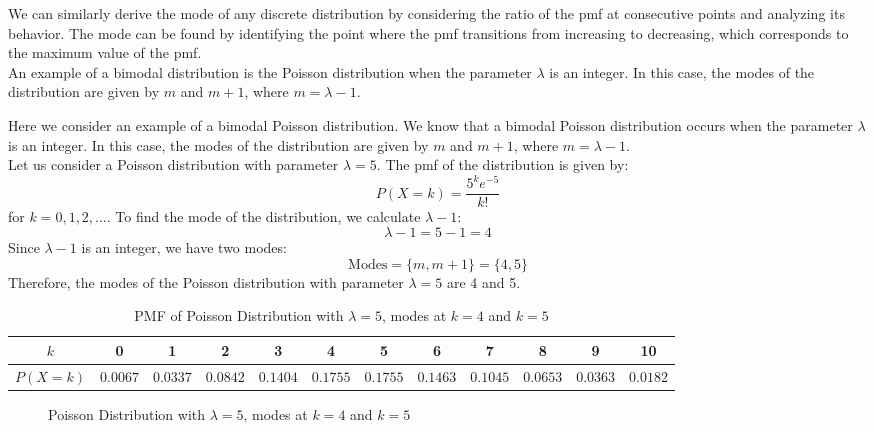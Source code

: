 \documentclass[openany]{book}
\begin{document}
\begin{mynote}
    We can similarly derive the mode of any discrete distribution by considering the ratio of the pmf at consecutive points and analyzing its behavior. The mode can be found by identifying the point where the pmf transitions from increasing to decreasing, which corresponds to the maximum value of the pmf. \\ An example of a bimodal distribution is the Poisson distribution when the parameter $\lambda$ is an integer. In this case, the modes of the distribution are given by $m$ and $m+1$, where $m = \lambda - 1$.
\end{mynote}
\begin{example}
    Here we consider an example of a bimodal Poisson distribution. We know that a bimodal Poisson distribution occurs when the parameter $\lambda$ is an integer. In this case, the modes of the distribution are given by $m$ and $m+1$, where $m = \lambda - 1$. \\
    Let us consider a Poisson distribution with parameter $\lambda = 5$. The pmf of the distribution is given by:
    $$P(X = k) = \frac{5^k e^{-5}}{k!}$$
    for $k = 0, 1, 2, \ldots$. To find the mode of the distribution, we calculate $\lambda - 1$:
    $$\lambda - 1 = 5 - 1 = 4$$
    Since $\lambda - 1$ is an integer, we have two modes:
    $$\text{Modes} = \{m, m+1\} = \{4, 5\}$$
    Therefore, the modes of the Poisson distribution with parameter $\lambda = 5$ are 4 and 5.
    \begin{table}[H]
        \centering
        \begin{tabular}{c|ccccccccccc}
            $k$ & 0 & 1 & 2 & 3 & 4 & 5 & 6 & 7 & 8 & 9 & 10 \\
            \hline
            $P(X = k)$ & $0.0067$ & $0.0337$ & $0.0842$ & $0.1404$ & $0.1755$ & $0.1755$ & $0.1463$ & $0.1045$ & $0.0653$ & $0.0363$ & $0.0182$ \\
        \end{tabular}
        \caption{PMF of Poisson Distribution with $\lambda = 5$, modes at $k = 4$ and $k = 5$}
    \end{table}
    \begin{figure}[H]
        \centering
        \caption{Poisson Distribution with $\lambda = 5$, modes at $k = 4$ and $k = 5$}
    \end{figure}
\end{example}
\end{document}

